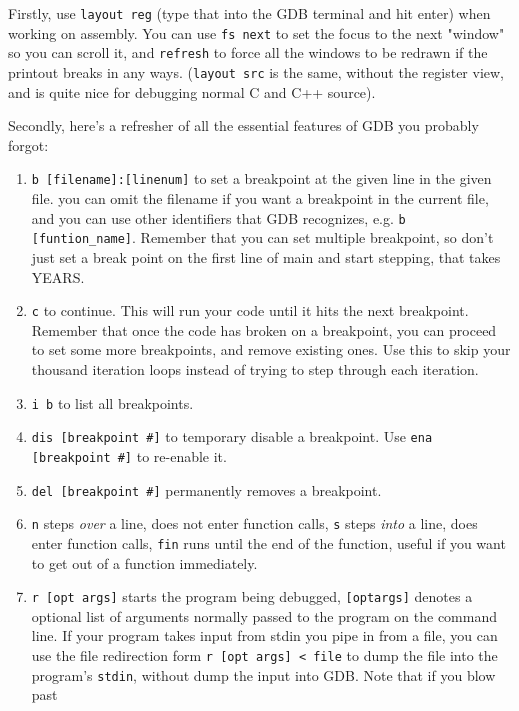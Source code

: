 \documentclass[11pt]{article}
\begin{document}
Firstly, use \texttt{layout reg} (type that into the GDB terminal and hit enter) when
working on assembly. You can use \texttt{fs next} to set the focus to the next "window" so
you can scroll it, and \texttt{refresh} to force all the windows to be redrawn if the
printout breaks in any ways. (\texttt{layout src} is the same, without the register view,
and is quite nice for debugging normal C and C++ source).

Secondly, here's a refresher of all the essential features of GDB you probably forgot:

\begin{enumerate}
    \item \texttt{b [filename]:[linenum]} to set a breakpoint at the given line in the
        given file. you can omit the filename if you want a breakpoint in the current
        file, and you can use other identifiers that GDB recognizes, e.g. \texttt{b
        [funtion\_name]}. Remember that you can set multiple breakpoint, so don't just set
        a break point on the first line of main and start stepping, that takes YEARS.
    \item \texttt{c} to continue. This will run your code until it hits the next
        breakpoint. Remember that once the code has broken on a breakpoint, you can
        proceed to set some more breakpoints, and remove existing ones. Use this to skip
        your thousand iteration loops instead of trying to step through each iteration.
    \item \texttt{i b} to list all breakpoints.
    \item \texttt{dis [breakpoint \#]} to temporary disable a breakpoint. Use \texttt{ena
        [breakpoint \#]} to re-enable it.
    \item \texttt{del [breakpoint \#]} permanently removes a breakpoint.
    \item \texttt{n} steps \emph{over} a line, does not enter function calls, \texttt{s}
        steps \emph{into} a line, does enter function calls, \texttt{fin} runs until the
        end of the function, useful if you want to get out of a function immediately.
    \item \texttt{r [opt args]} starts the program being debugged, \texttt{[optargs]}
        denotes a optional list of arguments normally passed to the program on the command
        line. If your program takes input from stdin you pipe in from a file, you can use
        the file redirection form \texttt{r [opt args] < file} to dump the file into
        the program's \texttt{stdin}, without dump the input into GDB. Note that if you blow past

\end{enumerate}
\end{document}
